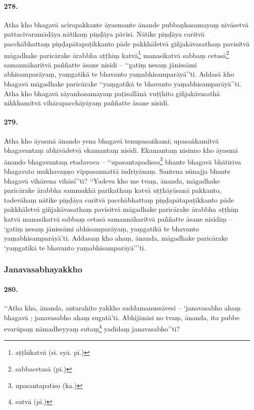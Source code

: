 \paragraph{278.} Atha kho bhagavā acirapakkante āyasmante ānande pubbaṇhasamayaṃ nivāsetvā pattacīvaramādāya nātikaṃ piṇḍāya pāvisi. Nātike piṇḍāya caritvā pacchābhattaṃ piṇḍapātapaṭikkanto pāde pakkhāletvā giñjakāvasathaṃ pavisitvā māgadhake paricārake ārabbha aṭṭhiṃ katvā\footnote{aṭṭhikatvā (sī. syā. pī.)} manasikatvā sabbaṃ cetasā\footnote{sabbacetasā (pī.)} samannāharitvā paññatte āsane nisīdi – ‘‘gatiṃ nesaṃ jānissāmi abhisamparāyaṃ, yaṃgatikā te bhavanto yaṃabhisamparāyā’’ti. Addasā kho bhagavā māgadhake paricārake ‘‘yaṃgatikā te bhavanto yaṃabhisamparāyā’’ti. Atha kho bhagavā sāyanhasamayaṃ paṭisallānā vuṭṭhito giñjakāvasathā nikkhamitvā vihārapacchāyāyaṃ paññatte āsane nisīdi.

\paragraph{279.} Atha kho āyasmā ānando yena bhagavā tenupasaṅkami; upasaṅkamitvā bhagavantaṃ abhivādetvā ekamantaṃ nisīdi. Ekamantaṃ nisinno kho āyasmā ānando bhagavantaṃ etadavoca – ‘‘upasantapadisso\footnote{upasantapatiso (ka.)} bhante bhagavā bhātiriva bhagavato mukhavaṇṇo vippasannattā indriyānaṃ. Santena nūnajja bhante bhagavā vihārena vihāsī’’ti? ‘‘Yadeva kho me tvaṃ, ānanda, māgadhake paricārake ārabbha sammukhā parikathaṃ katvā uṭṭhāyāsanā pakkanto, tadevāhaṃ nātike piṇḍāya caritvā pacchābhattaṃ piṇḍapātapaṭikkanto pāde pakkhāletvā giñjakāvasathaṃ pavisitvā māgadhake paricārake ārabbha aṭṭhiṃ katvā manasikatvā sabbaṃ cetasā samannāharitvā paññatte āsane nisīdiṃ – ‘gatiṃ nesaṃ jānissāmi abhisamparāyaṃ, yaṃgatikā te bhavanto yaṃabhisamparāyā’ti. Addasaṃ kho ahaṃ, ānanda, māgadhake paricārake ‘yaṃgatikā te bhavanto yaṃabhisamparāyā’’’ti.

\subsubsection{Janavasabhayakkho}

\paragraph{280.} ‘‘Atha kho, ānanda, antarahito yakkho saddamanussāvesi – ‘janavasabho ahaṃ bhagavā ; janavasabho ahaṃ sugatā’ti. Abhijānāsi no tvaṃ, ānanda, ito pubbe evarūpaṃ nāmadheyyaṃ sutaṃ\footnote{sutvā (pī.)} yadidaṃ janavasabho’’ti?

